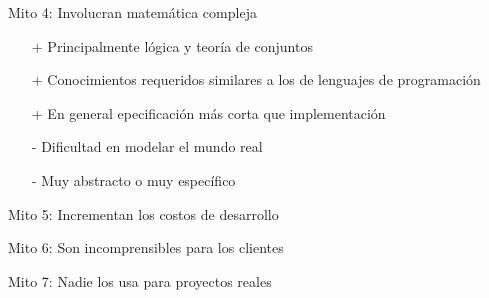 \documentclass{beamer}
\begin{document}
\begin{frame}{Mito 4: Involucran matem\'atica compleja}
\begin{itemize}[<+->]
\item[+] Principalmente l\'ogica y teor\'ia de conjuntos
\item[+] Conocimientos requeridos similares a los de lenguajes de programaci\'on
\item[+] En general epecificaci\'on m\'as corta que implementaci\'on
\item[-] Dificultad en modelar el mundo real
\item[-] Muy abstracto o muy espec\'ifico
\end{itemize}
\end{frame}
 
\begin{frame}{Mito 5: Incrementan los costos de desarrollo}
\end{frame}
 
\begin{frame}{Mito 6: Son incomprensibles para los clientes}
\end{frame}
 
\begin{frame}{Mito 7: Nadie los usa para proyectos reales}
\end{frame}
\end{document}

